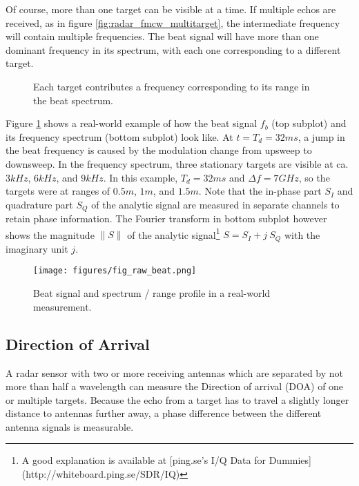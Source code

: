 Of course, more than one target can be visible at a time. If multiple
echos are received, as in figure \ref{fig:radar_fmcw_multitarget}, the intermediate frequency will
contain multiple frequencies. The beat signal will have more than one
dominant frequency in its spectrum, with each one corresponding to a
different target.

\begin{figure}[htp]
    \centering
    \label{fig:fmcw_multitarget}
    \def\svgwidth{\linewidth}
    
    \caption{Each target contributes a frequency corresponding to its range in the beat spectrum.}
\end{figure}

Figure \ref{fig:fmcw_multitarget} shows a real-world example of how the beat signal \(f_b\)
(top subplot) and its frequency spectrum (bottom subplot) look like. At
\(t=T_d=32ms\), a jump in the beat frequency is caused by the modulation
change from upsweep to downsweep. In the frequency spectrum, three
stationary targets are visible at ca. \(3kHz\), \(6kHz\), and \(9kHz\).
In this example, \(T_d=32ms\) and \(\Delta f=7GHz\), so the targets were
at ranges of \(0.5m\), \(1m\), and \(1.5m\). Note that the in-phase part
\(S_I\) and quadrature part \(S_Q\) of the analytic signal are measured
in separate channels to retain phase information. The Fourier transform
in bottom subplot however shows the magnitude \(\|S\|\) of the analytic
signal\footnote{A good explanation is available at [ping.se's I/Q Data for Dummies](http://whiteboard.ping.se/SDR/IQ)}
\(S = S_I + j~S_Q\) with the imaginary unit \(j\).

\begin{figure}[htp]
    \centering
    \label{fig:fig_raw_beat}
    \texttt{[image: figures/fig\_raw\_beat.png]}
    \caption{Beat signal and spectrum / range profile in a real-world measurement.}
\end{figure}

\subsection{Direction of Arrival}\label{direction-of-arrival}

A radar sensor with two or more receiving antennas which are separated
by not more than half a wavelength can measure the Direction of arrival
(DOA) of one or multiple targets. Because the echo from a target has to
travel a slightly longer distance to antennas further away, a phase
difference between the different antenna signals is measurable.


